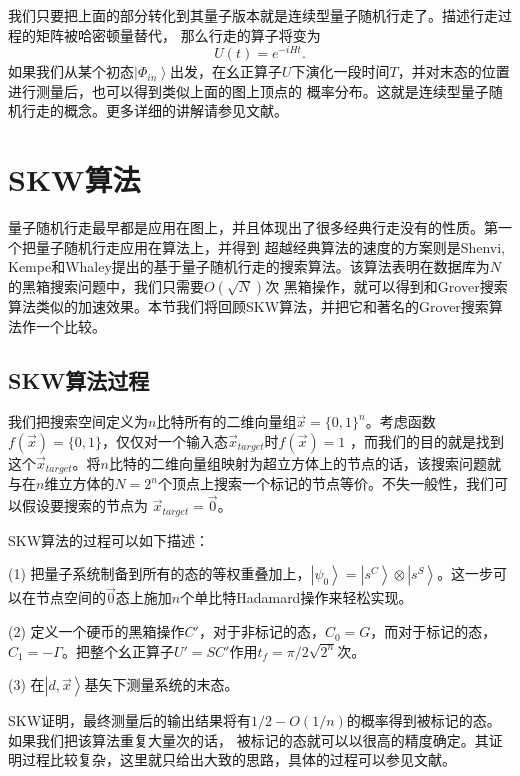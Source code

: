 我们只要把上面的部分转化到其量子版本就是连续型量子随机行走了。描述行走过程的矩阵被哈密顿量替代，
那么行走的算子将变为
\begin{equation}
         U(t)=e^{-iHt}.
\end{equation}
如果我们从某个初态$\left\vert \Phi_{in} \right \rangle$出发，在幺正算子$U$下演化一段时间$T$，并对末态的位置进行测量后，也可以得到类似上面的图上顶点的
概率分布。这就是连续型量子随机行走的概念。更多详细的讲解请参见文献\cite{rwview2}。

\section{SKW算法}

量子随机行走最早都是应用在图上，并且体现出了很多经典行走没有的性质。第一个把量子随机行走应用在算法上，并得到
超越经典算法的速度的方案则是Shenvi, Kempe和Whaley提出的基于量子随机行走的搜索算法\cite{skw}。该算法表明在数据库为$N$的黑箱搜索问题中，我们只需要$O(\sqrt{N})$次
黑箱操作，就可以得到和Grover搜索算法类似的加速效果。本节我们将回顾SKW算法，并把它和著名的Grover搜索算法\cite{grover}作一个比较。

\subsection{SKW算法过程}

我们把搜索空间定义为$n$比特所有的二维向量组$\overrightarrow{x} = \{0,1\}^n$。考虑函数$f(\overrightarrow{x}) = \{0,1\}$，仅仅对一个输入态$\overrightarrow{x} _{target}$时$f(\overrightarrow{x}) =1$ ，而我们的目的就是找到这个$\overrightarrow{x} _{target}$。将$n$比特的二维向量组映射为超立方体上的节点的话，该搜索问题就与在$n$维立方体的$N =2^n$个顶点上搜索一个标记的节点等价。不失一般性，我们可以假设要搜索的节点为 $\overrightarrow{x} _{target} = \overrightarrow{0}$。

SKW算法的过程可以如下描述：

(1) 把量子系统制备到所有的态的等权重叠加上，$\left\vert \psi_{0} \right \rangle = \left\vert s^C \right \rangle \otimes \left\vert s^S \right \rangle $。这一步可以在节点空间的$\overrightarrow{0}$态上施加$n$个单比特Hadamard操作来轻松实现。

(2) 定义一个硬币的黑箱操作$C'$，对于非标记的态，$C_0 = G$，而对于标记的态，$C_1 = -\Gamma$。把整个幺正算子$U' = SC'$作用$t_f = \pi/2\sqrt{2^n}$次。

(3) 在$\left\vert d,\overrightarrow{x} \right \rangle$基矢下测量系统的末态。

SKW证明，最终测量后的输出结果将有$1/2-O(1/n)$的概率得到被标记的态。如果我们把该算法重复大量次的话，
被标记的态就可以以很高的精度确定。其证明过程比较复杂，这里就只给出大致的思路，具体的过程可以参见文献\cite{skw}。

